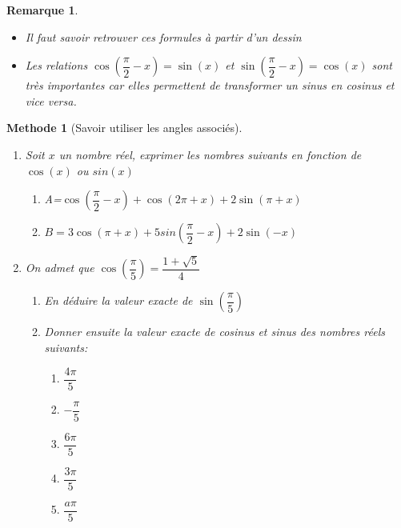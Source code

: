 \documentclass[10pt,a4paper]{article}
\theoremstyle{break}
\newtheorem{Rem}{Remarque}
\newtheorem{Meth}{Methode}
\begin{document}
		\begin{Rem}
			\begin{itemize}
				\item Il faut savoir retrouver ces formules à partir d'un dessin
				\item Les relations $\cos(\dfrac{\pi}{2}-x)=\sin(x)$ et 	$\sin(\dfrac{\pi}{2}-x)=\cos(x)$ sont très importantes car elles permettent de transformer un sinus en cosinus et vice versa.
			\end{itemize}
		\end{Rem}

		\begin{Meth}[Savoir utiliser les angles associés]
		\begin{enumerate}
			\item Soit $x$ un nombre réel, exprimer les nombres suivants en fonction de $\cos(x)$ ou $sin(x)$
			\begin{enumerate}
				\item A=$\cos(\dfrac{\pi}{2}-x)+\cos(2\pi+x)+2\sin(\pi+x)$
				\item$ B=3\cos(\pi+x)+5sin(\dfrac{\pi}{2}-x)+2\sin(-x)$
			\end{enumerate}
			\item On admet que $\cos(\dfrac{\pi}{5})=\dfrac{1+\sqrt{5}}{4}$
			\begin{enumerate}
				\item En déduire la valeur exacte de $\sin(\dfrac{\pi}{5})$
				\item  Donner ensuite la valeur exacte de cosinus et sinus des nombres réels suivants:
				\begin{multicols}{5}
					\begin{enumerate}
						\item $\dfrac{4\pi}{5}$
						\item $-\dfrac{\pi}{5}$
						\item $\dfrac{6\pi}{5}$
						\item $\dfrac{3\pi}{5}$
						\item $\dfrac{a\pi}{5}$
					\end{enumerate}
				\end{multicols}
			\end{enumerate}
		\end{enumerate}
	\end{Meth}
\newpage
\end{document}
